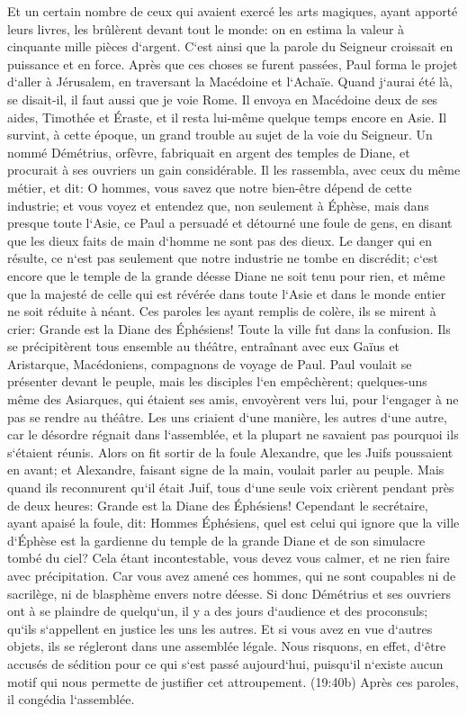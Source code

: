 \verse Et un certain nombre de ceux qui avaient exercé les arts magiques, ayant apporté leurs livres, les brûlèrent devant tout le monde: on en estima la valeur à cinquante mille pièces d`argent. 
\verse C`est ainsi que la parole du Seigneur croissait en puissance et en force. 
\verse Après que ces choses se furent passées, Paul forma le projet d`aller à Jérusalem, en traversant la Macédoine et l`Achaïe. Quand j`aurai été là, se disait-il, il faut aussi que je voie Rome. 
\verse Il envoya en Macédoine deux de ses aides, Timothée et Éraste, et il resta lui-même quelque temps encore en Asie. 
\verse Il survint, à cette époque, un grand trouble au sujet de la voie du Seigneur. 
\verse Un nommé Démétrius, orfèvre, fabriquait en argent des temples de Diane, et procurait à ses ouvriers un gain considérable. 
\verse Il les rassembla, avec ceux du même métier, et dit: O hommes, vous savez que notre bien-être dépend de cette industrie; 
\verse et vous voyez et entendez que, non seulement à Éphèse, mais dans presque toute l`Asie, ce Paul a persuadé et détourné une foule de gens, en disant que les dieux faits de main d`homme ne sont pas des dieux. 
\verse Le danger qui en résulte, ce n`est pas seulement que notre industrie ne tombe en discrédit; c`est encore que le temple de la grande déesse Diane ne soit tenu pour rien, et même que la majesté de celle qui est révérée dans toute l`Asie et dans le monde entier ne soit réduite à néant. 
\verse Ces paroles les ayant remplis de colère, ils se mirent à crier: Grande est la Diane des Éphésiens! 
\verse Toute la ville fut dans la confusion. Ils se précipitèrent tous ensemble au théâtre, entraînant avec eux Gaïus et Aristarque, Macédoniens, compagnons de voyage de Paul. 
\verse Paul voulait se présenter devant le peuple, mais les disciples l`en empêchèrent; 
\verse quelques-uns même des Asiarques, qui étaient ses amis, envoyèrent vers lui, pour l`engager à ne pas se rendre au théâtre. 
\verse Les uns criaient d`une manière, les autres d`une autre, car le désordre régnait dans l`assemblée, et la plupart ne savaient pas pourquoi ils s`étaient réunis. 
\verse Alors on fit sortir de la foule Alexandre, que les Juifs poussaient en avant; et Alexandre, faisant signe de la main, voulait parler au peuple. 
\verse Mais quand ils reconnurent qu`il était Juif, tous d`une seule voix crièrent pendant près de deux heures: Grande est la Diane des Éphésiens! 
\verse Cependant le secrétaire, ayant apaisé la foule, dit: Hommes Éphésiens, quel est celui qui ignore que la ville d`Éphèse est la gardienne du temple de la grande Diane et de son simulacre tombé du ciel? 
\verse Cela étant incontestable, vous devez vous calmer, et ne rien faire avec précipitation. 
\verse Car vous avez amené ces hommes, qui ne sont coupables ni de sacrilège, ni de blasphème envers notre déesse. 
\verse Si donc Démétrius et ses ouvriers ont à se plaindre de quelqu`un, il y a des jours d`audience et des proconsuls; qu`ils s`appellent en justice les uns les autres. 
\verse Et si vous avez en vue d`autres objets, ils se régleront dans une assemblée légale. 
\verse Nous risquons, en effet, d`être accusés de sédition pour ce qui s`est passé aujourd`hui, puisqu`il n`existe aucun motif qui nous permette de justifier cet attroupement. 
\verse (19:40b) Après ces paroles, il congédia l`assemblée. 

